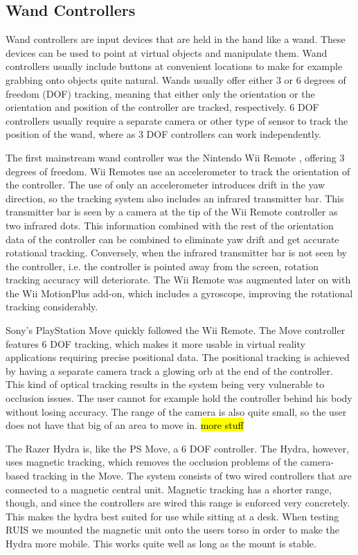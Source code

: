\documentclass[12pt,a4paper,oneside,pdftex]{report}
\begin{document}
\subsection{Wand Controllers}
\label{subsection:motion:move}

Wand controllers are input devices that are held in the hand like a wand. These devices can be used to point at virtual objects and manipulate them. Wand controllers usually include buttons at convenient locations to make for example grabbing onto objects quite natural. Wands usually offer either 3 or 6 degrees of freedom (DOF) tracking, meaning that either only the orientation or the orientation and position of the controller are tracked, respectively. 6 DOF controllers usually require a separate camera or other type of sensor to track the position of the wand, where as 3 DOF controllers can work independently.

The first mainstream wand controller was the Nintendo Wii Remote \cite{WiiRemoteMain}, offering 3 degrees of freedom. Wii Remotes use an accelerometer to track the orientation of the controller. The use of only an accelerometer introduces drift in the yaw direction, so the tracking system also includes an infrared transmitter bar. This transmitter bar is seen by a camera at the tip of the Wii Remote controller as two infrared dots. This information combined with the rest of the orientation data of the controller can be combined to eliminate yaw drift and get accurate rotational tracking. Conversely, when the infrared transmitter bar is not seen by the controller, i.e. the controller is pointed away from the screen, rotation tracking accuracy will deteriorate. The Wii Remote was augmented later on with the Wii MotionPlus add-on, which includes a gyroscope, improving the rotational tracking considerably. 

Sony's PlayStation Move \cite{PSMoveMain} quickly followed the Wii Remote. The Move controller features 6 DOF tracking, which makes it more usable in virtual reality applications requiring precise positional data. The positional tracking is achieved by having a separate camera track a glowing orb at the end of the controller. This kind of optical tracking results in the system being very vulnerable to occlusion issues. The user cannot for example hold the controller behind his body without losing accuracy. The range of the camera is also quite small, so the user does not have that big of an area to move in. \hl{more stuff}

The Razer Hydra is, like the PS Move, a 6 DOF controller. The Hydra, however, uses magnetic tracking, which removes the occlusion problems of the camera-based tracking in the Move. The system consists of two wired controllers that are connected to a magnetic central unit. Magnetic tracking has a shorter range, though, and since the controllers are wired this range is enforced very concretely. This makes the hydra best suited for use while sitting at a desk. When testing RUIS we mounted the magnetic unit onto the users torso in order to make the Hydra more mobile. This works quite well as long as the mount is stable. 
\end{document}
